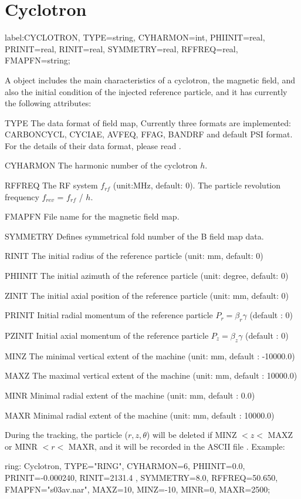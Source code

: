 \section{Cyclotron}
\label{sec:cyclotron}
\begin{example}
label:CYCLOTRON, TYPE=string, CYHARMON=int,
      PHIINIT=real, PRINIT=real, RINIT=real,
      SYMMETRY=real, RFFREQ=real, FMAPFN=string;
\end{example}
A  object includes the main characteristics of a cyclotron, the magnetic field,
 and also the initial condition of the injected reference particle, and it has currently the following attributes:
\begin{kdescription}
\item[TYPE]
    The data format of field map, Currently three formats are implemented:
    CARBONCYCL, CYCIAE, AVFEQ, FFAG, BANDRF and default PSI format.
    For the details of their data format, please read .
\item[CYHARMON]
    The harmonic number of the cyclotron $h$.
\item[RFFREQ]
    The RF system $f_{rf}$  (unit:MHz, default: 0).
    The particle revolution frequency $f_{rev}$ =  $f_{rf}$ / $h$.
\item[FMAPFN]
    File name for the magnetic field map.
\item[SYMMETRY]
    Defines symmetrical fold number of the B field map data.
\item[RINIT]
    The initial radius of the reference particle (unit: mm, default: 0)
\item[PHIINIT]
    The initial azimuth of the reference particle (unit: degree, default: 0)
\item[ZINIT]
    The initial axial position of the reference particle (unit: mm, default: 0)
\item[PRINIT]
    Initial radial momentum of the reference particle $P_r=\beta_r\gamma$ (default : 0)
\item[PZINIT]
    Initial axial momentum of the reference particle $P_z=\beta_z\gamma$ (default : 0)
\item[MINZ]
    The minimal vertical extent of the machine (unit: mm, default : -10000.0)
\item[MAXZ]
    The maximal vertical extent of the machine (unit: mm, default : 10000.0)
\item[MINR]
    Minimal radial extent of the machine (unit: mm, default : 0.0)
\item[MAXR]
    Minimal radial extent of the machine (unit: mm, default : 10000.0)
\end{kdescription}
During the tracking, the particle ($r, z, \theta$) will be deleted if MINZ $< z <$ MAXZ or MINR $< r <$ MAXR,  and it will be recorded in the ASCII file .
\noindent Example:
\begin{example}
ring: Cyclotron, TYPE="RING", CYHARMON=6, PHIINIT=0.0,
      PRINIT=-0.000240, RINIT=2131.4 , SYMMETRY=8.0,
      RFFREQ=50.650, FMAPFN="s03av.nar",
      MAXZ=10, MINZ=-10, MINR=0, MAXR=2500;
\end{example}

